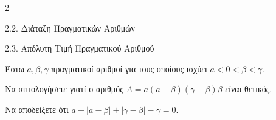 \begin{ylh}{2}
    \item 2.2. Διάταξη Πραγματικών Αριθμών
    \item 2.3. Απόλυτη Τιμή Πραγματικού Αριθμού
\end{ylh}
Έστω $a, \beta, \gamma$ πραγματικοί αριθμοί για τους οποίους ισχύει $a < 0 < \beta < \gamma$.

\begin{alist}
\item Να αιτιολογήσετε γιατί ο αριθμός $A = a(a - \beta)(\gamma - \beta)\beta$ είναι θετικός. 
\item Να αποδείξετε ότι $a + |a - \beta| + |\gamma - \beta| - \gamma = 0$. 
\end{alist}

